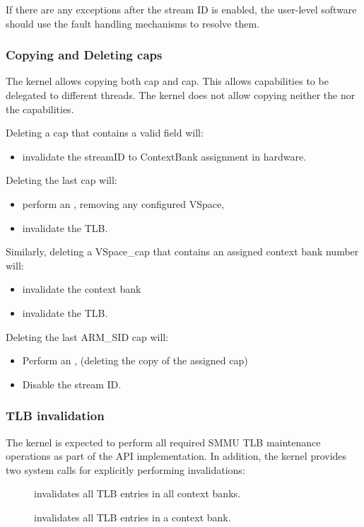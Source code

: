 If there are any exceptions after the stream ID is enabled, the user-level
software should use the fault handling mechanisms to resolve them.



\subsubsection{Copying and Deleting caps}
\label{sec:smmuv2-copying-and-deleting-caps}
The kernel allows copying both  cap and  cap.
This allows capabilities to be delegated to different threads.
The kernel does not allow copying neither the  nor
the  capabilities.

Deleting a  cap that contains a valid  field will:
\begin{itemize}
    \item invalidate the streamID to ContextBank assignment in hardware.
\end{itemize}

Deleting the last  cap will:
\begin{itemize}
    \item perform an ,
    removing any configured VSpace,
    \item invalidate the TLB.
\end{itemize}

Similarly, deleting a VSpace\_cap that contains an assigned context bank number will:
\begin{itemize}
    \item invalidate the context bank
    \item invalidate the TLB.
\end{itemize}

Deleting the last ARM\_SID cap will:
\begin{itemize}
    \item Perform an ,
        (deleting the copy of the assigned  cap)
    \item Disable the stream ID.
\end{itemize}

\subsubsection{TLB invalidation}
\label{sec:smmuv2-tlb-invalidation}
The kernel is expected to perform all required SMMU TLB maintenance operations
as part of the API implementation.  In addition, the kernel provides two system
calls for explicitly performing invalidations:
\begin{description}
    \item[]
        invalidates all TLB entries in all
    context banks.
    \item[]
        invalidates all TLB entries in a context bank.
\end{description}

